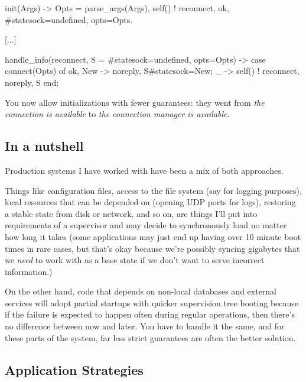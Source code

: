 \begin{VerbatimText}
init(Args) ->
    Opts = parse_args(Args),
    self() ! reconnect,
    {ok, #state{sock=undefined, opts=Opts}}.

[...]

handle_info(reconnect, S = #state{sock=undefined, opts=Opts}) ->
    case connect(Opts) of
        {ok, New} -> {noreply, S#state{sock=New}};
        _ -> self() ! reconnect, {noreply, S}
    end;
\end{VerbatimText}

You now allow initializations with fewer guarantees: they went from \emph{the connection is available} to \emph{the connection manager is available}.

\subsection{In a nutshell}
\label{subsec:start-link-in-a-nutshell}

Production systems I have worked with have been a mix of both approaches.

Things like configuration files, access to the file system (say for logging purposes), local resources that can be depended on (opening UDP ports for logs), restoring a stable state from disk or network, and so on, are things I'll put into requirements of a supervisor and may decide to synchronously load no matter how long it takes (some applications may just end up having over 10 minute boot times in rare cases, but that's okay because we're possibly syncing gigabytes that we \emph{need} to work with as a base state if we don't want to serve incorrect information.)

On the other hand, code that depends on non-local databases and external services will adopt partial startups with quicker supervision tree booting because if the failure is expected to happen often during regular operations,
then there's no difference between now and later. You have to handle it the same, and for these parts of the system, far less strict guarantees are often the better solution.

\subsection{Application Strategies}
\label{subsec:start-link-application-strategies}

